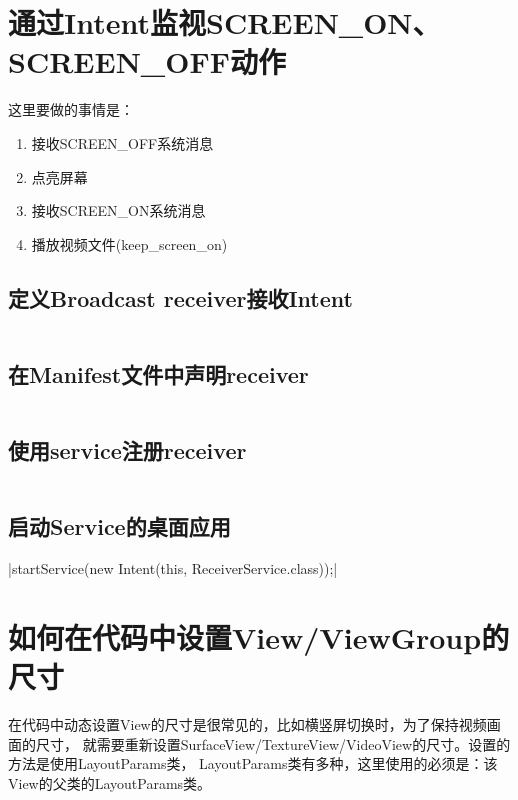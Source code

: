 ﻿\documentclass[a4paper,11pt]{article}
\begin{document}
  \section[通过Intent监视SCREEN\_ON、SCREEN\_OFF动作]{通过Intent监视SCREEN\_ON、SCREEN\_OFF动作}
  这里要做的事情是：
  \begin{enumerate}
    \item 接收SCREEN\_OFF系统消息
    \item 点亮屏幕
    \item 接收SCREEN\_ON系统消息
    \item 播放视频文件(keep\_screen\_on)
  \end{enumerate}
  \subsection[定义Broadcast receiver接收Intent]{定义Broadcast receiver接收Intent}
  \inputminted[linenos,tabsize=4,bgcolor=srcbg,fontsize=\small]{java}{ScreenBroadcastReceiver.java}

  \subsection[在Manifest文件中声明receiver]{在Manifest文件中声明receiver}
  \inputminted[linenos,tabsize=4,bgcolor=srcbg]{xml}{AndroidManifest.xml}

  \subsection[使用service注册receiver]{使用service注册receiver}
  \inputminted[linenos,tabsize=4,bgcolor=srcbg]{java}{ReceiverService.java}

  \subsection[启动Service的桌面应用]{启动Service的桌面应用}
  |startService(new Intent(this, ReceiverService.class));|


  \section[如何在代码中设置View/ViewGroup的尺寸]{如何在代码中设置View/ViewGroup的尺寸}
  在代码中动态设置View的尺寸是很常见的，比如横竖屏切换时，为了保持视频画面的尺寸，
  就需要重新设置SurfaceView/TextureView/VideoView的尺寸。设置的方法是使用LayoutParams类，
  LayoutParams类有多种，这里使用的必须是：该View的父类的LayoutParams类。
\end{document}
